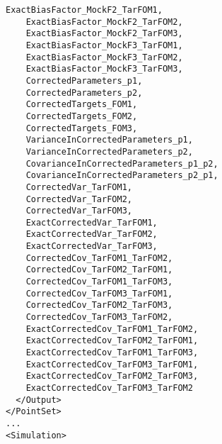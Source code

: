 \begin{lstlisting}[style=XML,morekeywords={subType}]
    ExactBiasFactor_MockF2_TarFOM1,
    ExactBiasFactor_MockF2_TarFOM2,
    ExactBiasFactor_MockF2_TarFOM3,
    ExactBiasFactor_MockF3_TarFOM1,
    ExactBiasFactor_MockF3_TarFOM2,
    ExactBiasFactor_MockF3_TarFOM3,
    CorrectedParameters_p1,
    CorrectedParameters_p2,
    CorrectedTargets_FOM1,
    CorrectedTargets_FOM2,
    CorrectedTargets_FOM3,
    VarianceInCorrectedParameters_p1,
    VarianceInCorrectedParameters_p2,
    CovarianceInCorrectedParameters_p1_p2,
    CovarianceInCorrectedParameters_p2_p1,
    CorrectedVar_TarFOM1,
    CorrectedVar_TarFOM2,
    CorrectedVar_TarFOM3,
    ExactCorrectedVar_TarFOM1,
    ExactCorrectedVar_TarFOM2,
    ExactCorrectedVar_TarFOM3,
    CorrectedCov_TarFOM1_TarFOM2,
    CorrectedCov_TarFOM2_TarFOM1,
    CorrectedCov_TarFOM1_TarFOM3,
    CorrectedCov_TarFOM3_TarFOM1,
    CorrectedCov_TarFOM2_TarFOM3,
    CorrectedCov_TarFOM3_TarFOM2,
    ExactCorrectedCov_TarFOM1_TarFOM2,
    ExactCorrectedCov_TarFOM2_TarFOM1,
    ExactCorrectedCov_TarFOM1_TarFOM3,
    ExactCorrectedCov_TarFOM3_TarFOM1,
    ExactCorrectedCov_TarFOM2_TarFOM3,
    ExactCorrectedCov_TarFOM3_TarFOM2
  </Output>
</PointSet>
...
<Simulation>
\end{lstlisting}
